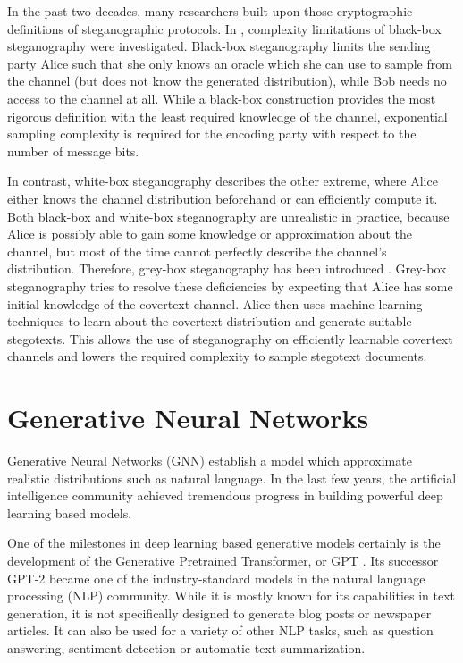 In the past two decades, many researchers built upon those cryptographic definitions of steganographic protocols.
In \cite{DIRR2008}, complexity limitations of black-box steganography were investigated.
Black-box steganography limits the sending party Alice such that she only knows an oracle which she can use to sample from the channel (but does not know the generated distribution), while Bob needs no access to the channel at all.
While a black-box construction provides the most rigorous definition with the least required knowledge of the channel, exponential sampling complexity is required for the encoding party with respect to the number of message bits.

In contrast, white-box steganography describes the other extreme, where Alice either knows the channel distribution beforehand or can efficiently compute it.
Both black-box and white-box steganography are unrealistic in practice, because Alice is possibly able to gain some knowledge or approximation about the channel, but most of the time cannot perfectly describe the channel's distribution.
Therefore, grey-box steganography has been introduced \cite{LRW2013}.
Grey-box steganography tries to resolve these deficiencies by expecting that Alice has some initial knowledge of the covertext channel.
Alice then uses machine learning techniques to learn about the covertext distribution and generate suitable stegotexts.
This allows the use of steganography on efficiently learnable covertext channels and lowers the required complexity to sample stegotext documents.

\section{Generative Neural Networks}
\label{sec:generative-neural-networks}

Generative Neural Networks (GNN) establish a model which approximate realistic distributions such as natural language.
In the last few years, the artificial intelligence community achieved tremendous progress in building powerful deep learning based models.

One of the milestones in deep learning based generative models certainly is the development of the Generative Pretrained Transformer, or GPT \cite{OpenAI2018}.
Its successor GPT-2 \cite{OpenAI2019} became one of the industry-standard models in the natural language processing (NLP) community.
While it is mostly known for its capabilities in text generation, it is not specifically designed to generate blog posts or newspaper articles.
It can also be used for a variety of other NLP tasks, such as question answering, sentiment detection or automatic text summarization.


